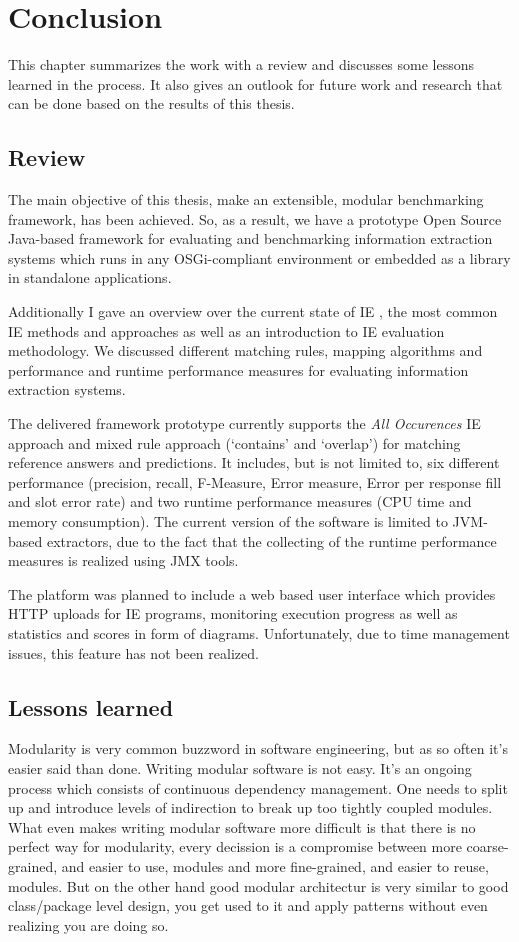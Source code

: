 \section{Conclusion}
\label{sec:conclusion}
This chapter summarizes the work with a review and discusses some lessons learned in the process. It also gives an outlook for future work and research that can be done based on the results of this thesis.

\subsection{Review}
The main objective of this thesis, make an extensible, modular benchmarking framework, has been achieved. So, as a result, we have a prototype Open Source Java-based framework for evaluating and benchmarking information extraction systems which runs in any \gls{OSGi}-compliant environment or embedded as a library in standalone applications.

Additionally I gave an overview over the current state of \gls{IE} , the most common \gls{IE} methods and approaches as well as an introduction to \gls{IE} evaluation methodology. We discussed different matching rules, mapping algorithms and performance and runtime performance measures for evaluating information extraction systems.

The delivered framework prototype currently supports the \textit{All Occurences} \gls{IE} approach and mixed rule approach (\enquote*{contains} and \enquote*{overlap}) for matching reference answers and predictions. It includes, but is not limited to, six different performance (precision, recall, F-Measure, Error measure, Error per response fill and slot error rate) and two runtime performance measures (CPU time and memory consumption). The current version of the software is limited to \acs{JVM}-based extractors, due to the fact that the collecting of the runtime performance measures is realized using \acs{JMX} tools.

The platform was planned to include a web based user interface which provides HTTP uploads for IE programs, monitoring execution progress as well as statistics and scores in form of diagrams. Unfortunately, due to time management issues, this feature has not been realized.

\subsection{Lessons learned}
Modularity is very common buzzword in software engineering, but as so often it's easier said than done. Writing modular software is not easy. It's an ongoing process which consists of continuous dependency management. One needs to split up and introduce levels of indirection to break up too tightly coupled modules. What even makes writing modular software more difficult is that there is no perfect way for modularity, every decission is a compromise between more coarse-grained, and easier to use, modules and more fine-grained, and easier to reuse, modules.  But on the other hand good modular architectur is very similar to good class/package level design, you get used to it and apply patterns without even realizing you are doing so.

